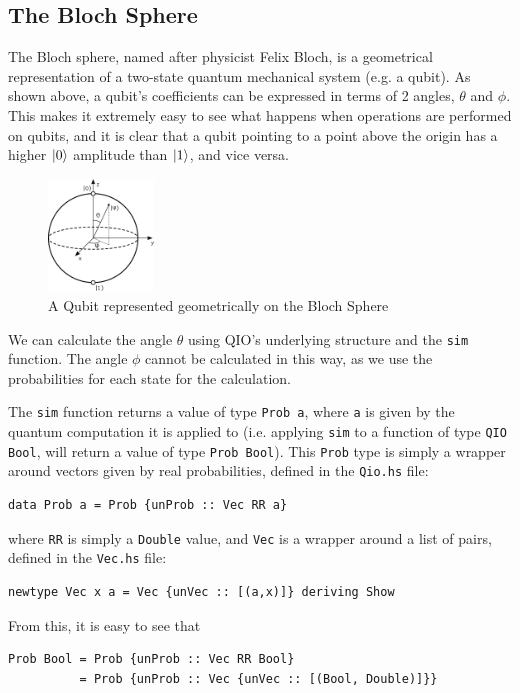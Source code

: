 \documentclass[a4paper,11pt, titlepage, twoside]{article}
\begin{document}
\subsection{The Bloch Sphere}
The Bloch sphere, named after physicist Felix Bloch, is a geometrical representation of a two-state quantum mechanical system (e.g. a qubit). As shown above, a qubit's coefficients can be expressed in terms of 2 angles, $\theta$ and $\phi$. This makes it extremely easy to see what happens when operations are performed on qubits, and it is clear that a qubit pointing to a point above the origin has a higher $\ket{0}$ amplitude than $\ket{1}$, and vice versa.\par
\begin{figure}[H]
	\centering
	\includegraphics[width=0.25\textwidth]{blochsphere}
	\caption{A Qubit represented geometrically on the Bloch Sphere}
\end{figure}
We can calculate the angle $\theta$ using QIO's underlying structure and the \texttt{sim} function. The angle $\phi$ cannot be calculated in this way, as we use the probabilities for each state for the calculation.\par
The \texttt{sim} function returns a value of type \texttt{Prob a}, where \texttt{a} is given by the quantum computation it is applied to (i.e. applying \texttt{sim} to a function of type \texttt{QIO Bool}, will return a value of type \texttt{Prob Bool}). This \texttt{Prob} type is simply a wrapper around vectors given by real probabilities, defined in the \texttt{Qio.hs} file:
\begin{verbatim}
data Prob a = Prob {unProb :: Vec RR a}
\end{verbatim}
where \texttt{RR} is simply a \texttt{Double} value, and \texttt{Vec} is a wrapper around a list of pairs, defined in the \texttt{Vec.hs} file:
\begin{verbatim}
newtype Vec x a = Vec {unVec :: [(a,x)]} deriving Show
\end{verbatim}
From this, it is easy to see that
\begin{verbatim}
Prob Bool = Prob {unProb :: Vec RR Bool} 
          = Prob {unProb :: Vec {unVec :: [(Bool, Double)]}}
\end{verbatim}
\end{document}
